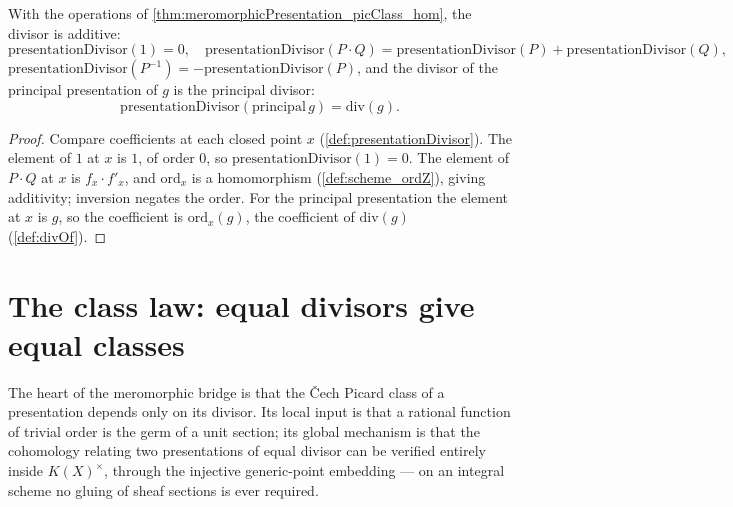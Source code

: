 \begin{theorem}
  \label{thm:presentationDivisor_hom}
  \leanok
  With the operations of \ref{thm:meromorphicPresentation_picClass_hom}, the divisor is additive:
  \[
    \mathrm{presentationDivisor}(1) = 0, \quad \mathrm{presentationDivisor}(P \cdot Q) =
      \mathrm{presentationDivisor}(P) + \mathrm{presentationDivisor}(Q),
  \]
  \(\mathrm{presentationDivisor}(P^{-1}) = -\mathrm{presentationDivisor}(P)\), and the divisor of
  the principal presentation of \(g\) is the principal divisor:
  \[
    \mathrm{presentationDivisor}(\mathrm{principal}\, g) = \mathrm{div}(g).
  \]
\end{theorem}
\begin{proof}
  \leanok
  Compare coefficients at each closed point \(x\) (\ref{def:presentationDivisor}). The element of
  \(1\) at \(x\) is \(1\), of order \(0\), so \(\mathrm{presentationDivisor}(1) = 0\). The element
  of \(P \cdot Q\) at \(x\) is \(f_x \cdot f'_x\), and \(\mathrm{ord}_x\) is a homomorphism
  (\ref{def:scheme_ordZ}), giving additivity; inversion negates the order. For the principal
  presentation the element at \(x\) is \(g\), so the coefficient is \(\mathrm{ord}_x(g)\), the
  coefficient of \(\mathrm{div}(g)\) (\ref{def:divOf}).
\end{proof}

\section{The class law: equal divisors give equal classes}

The heart of the meromorphic bridge is that the \v Cech Picard class of a presentation depends
only on its divisor. Its local input is that a rational function of trivial order is the germ of a
unit section; its global mechanism is that the cohomology relating two presentations of equal
divisor can be verified entirely inside \(K(X)^{\times}\), through the injective generic-point
embedding --- on an integral scheme no gluing of sheaf sections is ever required.

